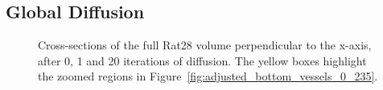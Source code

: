   \subsection{Global Diffusion} %
  \label{sub:global_diffusion}
    \begin{figure}[htbp]
      \centering
      \caption{Cross-sections of the full Rat28 volume perpendicular to the x-axis, after 0, 1 and 20 iterations of diffusion. The yellow boxes highlight the zoomed regions in Figure~\ref{fig:adjusted_bottom_vessels_0_235}.}
      \label{fig:adjusted_0_235}
    \end{figure}

